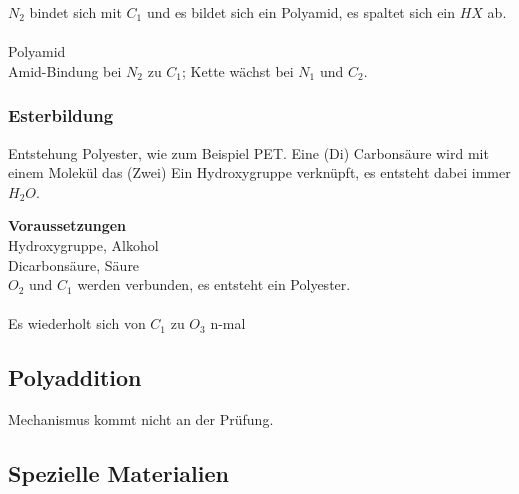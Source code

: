 
$N_2$ bindet sich mit $C_1$ und es bildet sich ein Polyamid, es spaltet sich ein $HX$ ab.\\

\\

Polyamid\\

Amid-Bindung bei $N_2$ zu $C_1$; Kette wächst bei $N_1$ und $C_2$.

\subsubsection{Esterbildung}

Entstehung Polyester, wie zum Beispiel PET. Eine (Di) Carbonsäure wird mit einem Molekül das (Zwei) Ein Hydroxygruppe verknüpft, es entsteht dabei immer $H_2O$.

\textbf{Voraussetzungen}\\


 Hydroxygruppe, Alkohol\\


 Dicarbonsäure, Säure\\

$O_2$ und $C_1$ werden verbunden, es entsteht ein Polyester.\\

\\

Es wiederholt sich von $C_1$ zu $O_3$ n-mal

\subsection{Polyaddition}

Mechanismus kommt nicht an der Prüfung.

\subsection{Spezielle Materialien}


